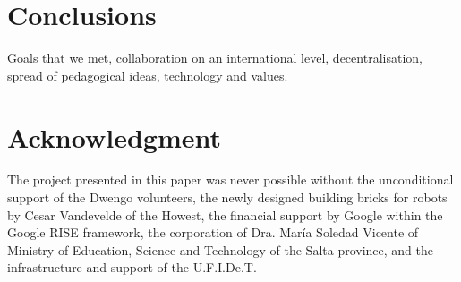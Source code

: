 \documentclass[a4paper]{llncs}
\begin{document}
\section{Conclusions}
Goals that we met, collaboration on an international level, decentralisation, spread of pedagogical ideas, technology and values.


\section*{Acknowledgment}
The project presented in this paper was never possible without the unconditional support of the Dwengo volunteers, the newly designed building bricks for robots by Cesar Vandevelde of the Howest, the financial support by Google within the Google RISE framework, the corporation of Dra. María Soledad Vicente of Ministry of Education, Science and Technology of the Salta province, and the infrastructure and support of the U.F.I.De.T.



\end{document}
